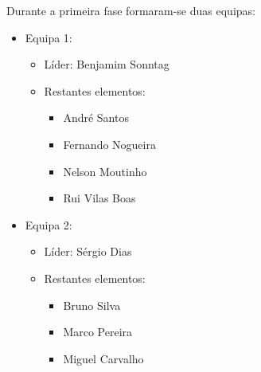 Durante a primeira fase formaram-se duas equipas:
\begin{itemize}
    \item Equipa 1:
        \begin{itemize}
        \item Líder:  Benjamim Sonntag
        \item Restantes elementos:
            \begin{itemize}
                \item André Santos
                \item Fernando Nogueira
                \item Nelson Moutinho
                \item Rui Vilas Boas
            \end{itemize}
        \end{itemize}
    \item Equipa 2:
        \begin{itemize}
            \item Líder: Sérgio Dias
            \item Restantes elementos: 
                \begin{itemize}
                    \item Bruno Silva
                    \item Marco Pereira
                    \item Miguel Carvalho
                \end{itemize}
        \end{itemize}
\end{itemize}

